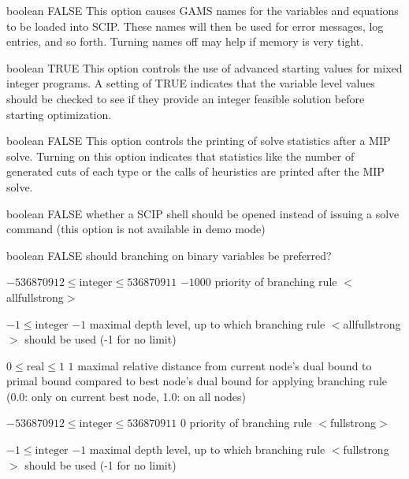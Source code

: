 %
{boolean}%
{FALSE}%
{This option causes GAMS names for the variables and equations to be loaded into SCIP. These names will then be used for error messages, log entries, and so forth. Turning names off may help if memory is very tight.}%
{}

%
{boolean}%
{TRUE}%
{This option controls the use of advanced starting values for mixed integer programs. A setting of TRUE indicates that the variable level values should be checked to see if they provide an integer feasible solution before starting optimization.}%
{}

%
{boolean}%
{FALSE}%
{This option controls the printing of solve statistics after a MIP solve. Turning on this option indicates that statistics like the number of generated cuts of each type or the calls of heuristics are printed after the MIP solve.}%
{}

%
{boolean}%
{FALSE}%
{whether a SCIP shell should be opened instead of issuing a solve command (this option is not available in demo mode)}%
{}

%
{boolean}%
{FALSE}%
{should branching on binary variables be preferred?}%
{}

%
{$-536870912\leq\textrm{integer}\leq536870911$}%
{$-1000$}%
{priority of branching rule $<$allfullstrong$>$}%
{}

%
{$-1\leq\textrm{integer}$}%
{$-1$}%
{maximal depth level, up to which branching rule $<$allfullstrong$>$ should be used (-1 for no limit)}%
{}

%
{$0\leq\textrm{real}\leq1$}%
{$1$}%
{maximal relative distance from current node's dual bound to primal bound compared to best node's dual bound for applying branching rule (0.0: only on current best node, 1.0: on all nodes)}%
{}

%
{$-536870912\leq\textrm{integer}\leq536870911$}%
{$0$}%
{priority of branching rule $<$fullstrong$>$}%
{}

%
{$-1\leq\textrm{integer}$}%
{$-1$}%
{maximal depth level, up to which branching rule $<$fullstrong$>$ should be used (-1 for no limit)}%
{}

